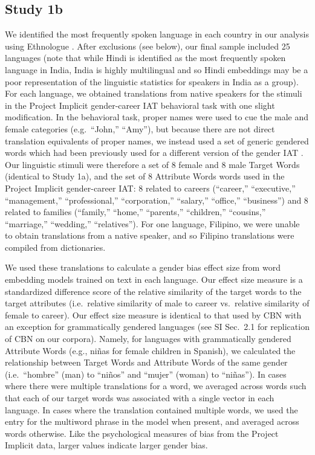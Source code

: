 \documentclass[9pt,twocolumn,twoside]{pnas-new}
\begin{document}
{\subsection*{Study 1b}



We identified the most frequently spoken language in each country in our
analysis using Ethnologue \cite{simons2018}. After exclusions
(see below), our final sample included 25
languages (note that while Hindi is identified as the most frequently spoken language in India, India is highly multilingual and so Hindi embeddings may be a poor representation of  the linguistic statistics for speakers in India as a group).
For each language, we obtained translations from native speakers for the
stimuli in the Project Implicit gender-career IAT behavioral task \cite{nosek2002harvesting} with one slight modification. In the behavioral task,
proper names were used to cue the male and female categories
(e.g.~\enquote{John,} \enquote{Amy}), but because there are not direct
translation equivalents of proper names, we instead used a set of
generic gendered words which had been previously used for a different
version of the gender IAT \citep[e.g., ``man,'' ``woman;''][]{nosek2002harvesting}. Our linguistic stimuli were therefore a set of 8 female and 8
male Target Words (identical to Study 1a), and the set of 8 Attribute
Words words used in the Project Implicit gender-career IAT: 8 related to
careers (\enquote{career,} \enquote{executive,} \enquote{management,}
\enquote{professional,} \enquote{corporation,} \enquote{salary,}
\enquote{office,} \enquote{business}) and 8 related to families
(\enquote{family,} \enquote{home,} \enquote{parents,}
\enquote{children,} \enquote{cousins,} \enquote{marriage,}
\enquote{wedding,} \enquote{relatives}). For one language, Filipino, we
were unable to obtain translations from a native speaker, and so
Filipino translations were compiled from dictionaries.

We used these translations to calculate a gender bias effect size from
word embedding models trained on text in each language. Our effect size
measure is a standardized difference score of the relative similarity of
the target words to the target attributes (i.e.~relative similarity of
male to career vs.~relative similarity of female to career). Our effect
size measure is identical to that used by CBN with an exception for
grammatically gendered languages (see SI Sec.\ 2.1 for replication of CBN on our
corpora). Namely, for languages with grammatically gendered Attribute
Words (e.g., niñas for female children in Spanish), we calculated the
relationship between Target Words and Attribute Words of the same gender
(i.e.~\enquote{hombre} (man) to \enquote{niños} and \enquote{mujer}
(woman) to \enquote{niñas}). In cases where there were multiple
translations for a word, we averaged across words such that each of our
target words was associated with a single vector in each language. In
cases where the translation contained multiple words, we used the entry
for the multiword phrase in the model when present, and averaged across
words otherwise. Like the psychological measures of bias from the
Project Implicit data, larger values indicate larger gender bias.

}
\end{document}
